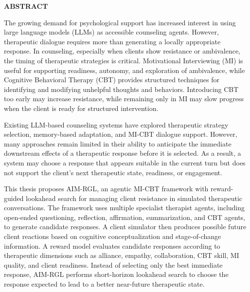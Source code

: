 {}

\begin{center}
    \large{\bf ABSTRACT}
\end{center}

The growing demand for psychological support has increased interest in using large language models (LLMs) as accessible counseling agents. However, therapeutic dialogue requires more than generating a locally appropriate response. In counseling, especially when clients show resistance or ambivalence, the timing of therapeutic strategies is critical. Motivational Interviewing (MI) is useful for supporting readiness, autonomy, and exploration of ambivalence, while Cognitive Behavioral Therapy (CBT) provides structured techniques for identifying and modifying unhelpful thoughts and behaviors. Introducing CBT too early may increase resistance, while remaining only in MI may slow progress when the client is ready for structured intervention.

Existing LLM-based counseling systems have explored therapeutic strategy selection, memory-based adaptation, and MI-CBT dialogue support. However, many approaches remain limited in their ability to anticipate the immediate downstream effects of a therapeutic response before it is selected. As a result, a system may choose a response that appears suitable in the current turn but does not support the client’s next therapeutic state, readiness, or engagement.

This thesis proposes AIM-RGL, an agentic MI-CBT framework with reward-guided lookahead search for managing client resistance in simulated therapeutic conversations. The framework uses multiple specialist therapist agents, including open-ended questioning, reflection, affirmation, summarization, and CBT agents, to generate candidate responses. A client simulator then produces possible future client reactions based on cognitive conceptualization and stage-of-change information. A reward model evaluates candidate responses according to therapeutic dimensions such as alliance, empathy, collaboration, CBT skill, MI quality, and client readiness. Instead of selecting only the best immediate response, AIM-RGL performs short-horizon lookahead search to choose the response expected to lead to a better near-future therapeutic state.

